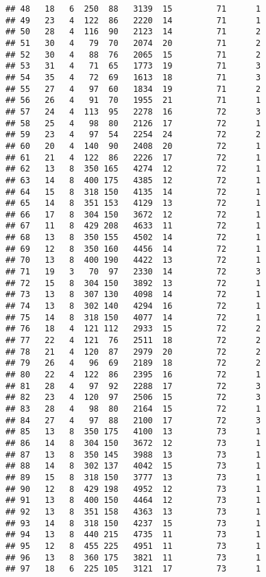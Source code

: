 \documentclass[]{article}
\begin{document}
\begin{verbatim}
## 48   18   6  250  88   3139  15         71      1
## 49   23   4  122  86   2220  14         71      1
## 50   28   4  116  90   2123  14         71      2
## 51   30   4   79  70   2074  20         71      2
## 52   30   4   88  76   2065  15         71      2
## 53   31   4   71  65   1773  19         71      3
## 54   35   4   72  69   1613  18         71      3
## 55   27   4   97  60   1834  19         71      2
## 56   26   4   91  70   1955  21         71      1
## 57   24   4  113  95   2278  16         72      3
## 58   25   4   98  80   2126  17         72      1
## 59   23   4   97  54   2254  24         72      2
## 60   20   4  140  90   2408  20         72      1
## 61   21   4  122  86   2226  17         72      1
## 62   13   8  350 165   4274  12         72      1
## 63   14   8  400 175   4385  12         72      1
## 64   15   8  318 150   4135  14         72      1
## 65   14   8  351 153   4129  13         72      1
## 66   17   8  304 150   3672  12         72      1
## 67   11   8  429 208   4633  11         72      1
## 68   13   8  350 155   4502  14         72      1
## 69   12   8  350 160   4456  14         72      1
## 70   13   8  400 190   4422  13         72      1
## 71   19   3   70  97   2330  14         72      3
## 72   15   8  304 150   3892  13         72      1
## 73   13   8  307 130   4098  14         72      1
## 74   13   8  302 140   4294  16         72      1
## 75   14   8  318 150   4077  14         72      1
## 76   18   4  121 112   2933  15         72      2
## 77   22   4  121  76   2511  18         72      2
## 78   21   4  120  87   2979  20         72      2
## 79   26   4   96  69   2189  18         72      2
## 80   22   4  122  86   2395  16         72      1
## 81   28   4   97  92   2288  17         72      3
## 82   23   4  120  97   2506  15         72      3
## 83   28   4   98  80   2164  15         72      1
## 84   27   4   97  88   2100  17         72      3
## 85   13   8  350 175   4100  13         73      1
## 86   14   8  304 150   3672  12         73      1
## 87   13   8  350 145   3988  13         73      1
## 88   14   8  302 137   4042  15         73      1
## 89   15   8  318 150   3777  13         73      1
## 90   12   8  429 198   4952  12         73      1
## 91   13   8  400 150   4464  12         73      1
## 92   13   8  351 158   4363  13         73      1
## 93   14   8  318 150   4237  15         73      1
## 94   13   8  440 215   4735  11         73      1
## 95   12   8  455 225   4951  11         73      1
## 96   13   8  360 175   3821  11         73      1
## 97   18   6  225 105   3121  17         73      1

\end{verbatim}
\end{document}
